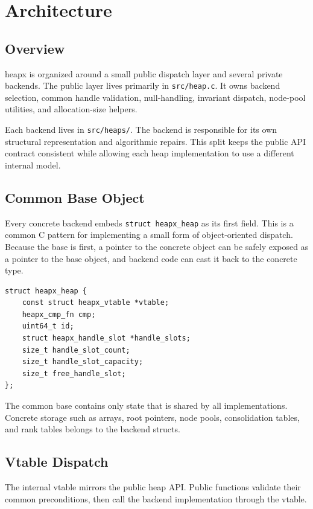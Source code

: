 \chapter{Architecture}

\section{Overview}

heapx is organized around a small public dispatch layer and several private backends.
The public layer lives primarily in \texttt{src/heap.c}.
It owns backend selection, common handle validation, null-handling, invariant dispatch, node-pool utilities, and allocation-size helpers.

Each backend lives in \texttt{src/heaps/}.
The backend is responsible for its own structural representation and algorithmic repairs.
This split keeps the public API contract consistent while allowing each heap implementation to use a different internal model.

\section{Common Base Object}

Every concrete backend embeds \texttt{struct heapx\_heap} as its first field.
This is a common C pattern for implementing a small form of object-oriented dispatch.
Because the base is first, a pointer to the concrete object can be safely exposed as a pointer to the base object, and backend code can cast it back to the concrete type.

\begin{lstlisting}[style=cstyle, caption={Simplified common base object.}]
struct heapx_heap {
    const struct heapx_vtable *vtable;
    heapx_cmp_fn cmp;
    uint64_t id;
    struct heapx_handle_slot *handle_slots;
    size_t handle_slot_count;
    size_t handle_slot_capacity;
    size_t free_handle_slot;
};
\end{lstlisting}

The common base contains only state that is shared by all implementations.
Concrete storage such as arrays, root pointers, node pools, consolidation tables, and rank tables belongs to the backend structs.

\section{Vtable Dispatch}

The internal vtable mirrors the public heap API.
Public functions validate their common preconditions, then call the backend implementation through the vtable.


